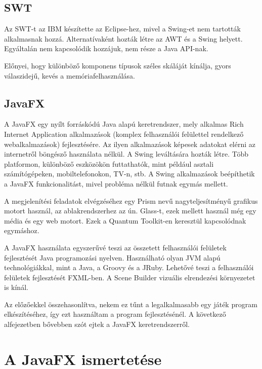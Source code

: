 \subsection*{SWT}

Az SWT-t az IBM készítette az Eclipse-hez, mivel a Swing-et nem tartották alkalmasnak hozzá.
Alternatívaként hozták létre az AWT és a Swing helyett.
Egyáltalán nem kapcsolódik hozzájuk, nem része a Java API-nak.

Előnyei, hogy különböző komponens típusok széles skáláját kínálja, gyors válaszidejű, kevés a memóriafelhasználása.


\subsection*{JavaFX}

A JavaFX egy nyílt forráskódú Java alapú keretrendszer, mely alkalmas Rich Internet Application alkalmazások (komplex felhasználói felülettel rendelkező webalkalmazások) fejlesztésére.
Az ilyen alkalmazások képesek adatokat elérni az internetről böngésző használata nélkül.
A Swing leváltására hozták létre.
Több platformon, különböző eszközökön futtathatók, mint például asztali számítógépeken, mobiltelefonokon, TV-n, stb.
A Swing alkalmazások beépíthetik a JavaFX funkcionalitást, mivel probléma nélkül futnak egymás mellett.

A megjelenítési feladatok elvégzéséhez egy Prism nevű nagyteljesítményű grafikus motort használ, az ablakrendszerhez az ún. Glass-t, ezek mellett használ még egy média és egy web motort.
Ezek a Quantum Toolkit-en keresztül kapcsolódnak egymáshoz.

A JavaFX használata egyszerűvé teszi az összetett felhasználói felületek fejlesztését Java programozási nyelven.
Használható olyan JVM alapú technológiákkal, mint a Java, a Groovy és a JRuby.
Lehetővé teszi a felhasználói felületek fejlesztését FXML-ben.
A Scene Builder vizuális elrendezési környezetet is kínál.

Az előzőekkel összehasonlítva, nekem ez tűnt a legalkalmasabb egy játék program elkészítéséhez, így ezt használtam a program fejlesztésénél.
A következő alfejezetben bővebben szót ejtek a JavaFX keretrendszerről.


\section{A JavaFX ismertetése}

